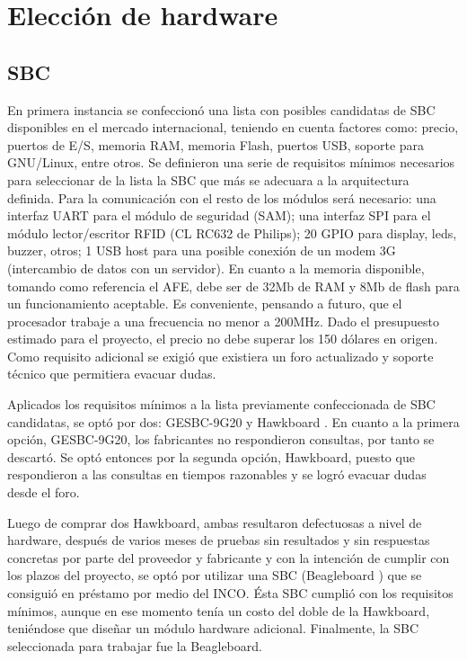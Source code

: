 \bigskip


\section{Elecci\'on de hardware}

\subsection{SBC}
En primera instancia se confeccionó una lista con posibles candidatas de SBC disponibles
en el mercado internacional, teniendo en cuenta factores como: precio, puertos de E/S, memoria RAM, memoria Flash, puertos USB, soporte para GNU/Linux, entre otros.
Se definieron una serie de requisitos mínimos necesarios para seleccionar de la lista la SBC que más se adecuara a la arquitectura definida.
Para la comunicación con el resto de los módulos será necesario: una interfaz UART para el módulo de seguridad (SAM); una interfaz SPI para el módulo lector/escritor RFID (CL RC632 de Philips); 20 GPIO para display, leds, buzzer, otros; 1 USB host para una posible conexión de un modem 3G (intercambio de datos con un servidor). En cuanto a la memoria disponible, tomando como referencia el AFE, debe ser de 32Mb de RAM y 8Mb de flash para un funcionamiento aceptable. Es conveniente, pensando a futuro, que el procesador trabaje a una frecuencia no menor a 200MHz.
Dado el presupuesto estimado para el proyecto, el precio no debe superar los 150 dólares en origen.
Como requisito adicional se exigió que existiera un foro actualizado y soporte técnico que permitiera evacuar dudas.


Aplicados los requisitos mínimos a la lista previamente confeccionada de SBC candidatas, se optó por dos: GESBC-9G20 \cite{9G20} y Hawkboard \cite{Hawk}.
En cuanto a la primera opción, GESBC-9G20, los fabricantes no respondieron consultas, por tanto se descartó. Se optó entonces por la segunda opción, Hawkboard, puesto que respondieron a las consultas en tiempos razonables y se logró evacuar dudas desde el foro.


Luego de comprar dos Hawkboard, ambas resultaron defectuosas a nivel de hardware, después de varios meses de pruebas sin resultados y sin respuestas concretas por parte del proveedor y fabricante y con la intención de cumplir con los plazos del proyecto, se optó por utilizar una SBC (Beagleboard \cite{Beagle}) que se consiguió en préstamo por medio del INCO. Ésta SBC cumplió con los requisitos mínimos, aunque en ese momento tenía un costo del doble de la Hawkboard, teniéndose que diseñar un módulo hardware adicional.
Finalmente, la SBC seleccionada para trabajar fue la Beagleboard.


